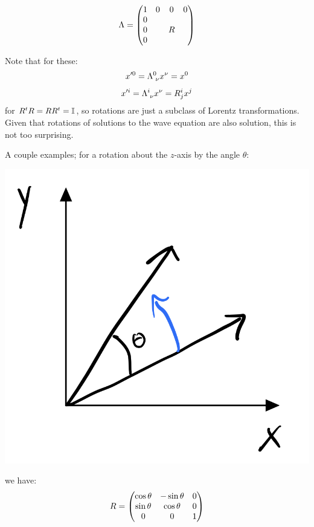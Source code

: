 \begin{equation}
    \Lambda = \begin{pmatrix}1 & 0 & 0 & 0 \\ 0 & & & \\ 0 & & R & \\ 0 & & &\end{pmatrix}
\end{equation}

Note that for these:
\begin{equation}
    x'^0 = \Lambda^0_{\sp \nu}x^\nu = x^0
\end{equation}
\begin{equation}
    x'^i = \Lambda^{i}_{\sp\nu}x^\nu = R^i_j x^j
\end{equation}
for $R^t R = RR^t = \mathbb{I}$, so rotations are just a subclass of Lorentz transformations. Given that rotations of solutions to the wave equation are also solution, this is not too surprising.

A couple examples; for a rotation about the $z$-axis by the angle $\theta$:
\begin{center}
    \begin{center}
        \includegraphics[scale=0.35]{Lectures/Images/lec2-rotation.png}
    \end{center}
    
\end{center}
we have:
\begin{equation}
    R = \begin{pmatrix}\cos\theta & -\sin\theta & 0 \\ \sin\theta & \cos\theta & 0 \\ 0 & 0 & 1\end{pmatrix}
\end{equation}

